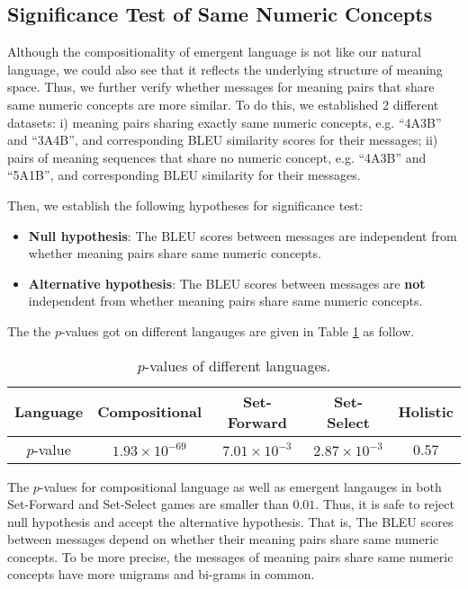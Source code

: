 \subsection{Significance Test of Same Numeric Concepts}
\label{ssec4.2.3:significance_test}

Although the compositionality of emergent language is not like our natural language, we could also see that it reflects the underlying structure of meaning space. Thus, we further verify whether messages for meaning pairs that share same numeric concepts are more similar. To do this, we established 2 different datasets: i) meaning pairs sharing exactly same numeric concepts, e.g. ``4A3B'' and ``3A4B'', and corresponding BLEU similarity scores for their messages; ii) pairs of meaning sequences that share no numeric concept, e.g. ``4A3B'' and ``5A1B'', and corresponding BLEU similarity for their messages.

Then, we establish the following hypotheses for significance test:

\begin{itemize}
    \item \textbf{Null hypothesis}: The BLEU scores between messages are independent from whether meaning pairs share same numeric concepts.
    \item \textbf{Alternative hypothesis}: The BLEU scores between messages are \textbf{not} independent from whether meaning pairs share same numeric concepts.
\end{itemize}

The the $p$-values got on different langauges are given in Table \ref{tab4.5:p-values} as follow.

\begin{table}[!h]
    \centering
    \begin{tabular}{|c|c|c|c|c|}
    \hline
    Language  & Compositional         & Set-Forward          & Set-Select           & Holistic \\ \hline
    $p$-value & $1.93\times 10^{-69}$ & $7.01\times 10^{-3}$ & $2.87\times 10^{-3}$ & 0.57 \\ \hline
    \end{tabular}
    \caption{$p$-values of different languages.}
    \label{tab4.5:p-values}
\end{table}

The $p$-values for compositional language as well as emergent langauges in both Set-Forward and Set-Select games are smaller than $0.01$. Thus, it is safe to reject null hypothesis and accept the alternative hypothesis. That is, The BLEU scores between messages depend on whether their meaning pairs share same numeric concepts. To be more precise, the messages of meaning pairs share same numeric concepts have more unigrams and bi-grams in common.

